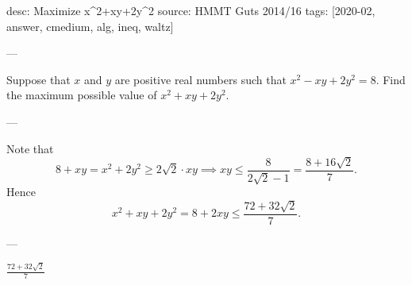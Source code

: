 desc: Maximize x^2+xy+2y^2
source: HMMT Guts 2014/16
tags: [2020-02, answer, cmedium, alg, ineq, waltz]

---

Suppose that $x$ and $y$ are positive real numbers such that $x^2-xy+2y^2=8$. Find the maximum possible value of $x^2+xy+2y^2$.

---

Note that \[8+xy=x^2+2y^2\ge2\sqrt2\cdot xy\implies xy\le\frac8{2\sqrt2-1}=\frac{8+16\sqrt2}7.\]
Hence \[x^2+xy+2y^2=8+2xy\le\frac{72+32\sqrt2}7.\]

---

$\frac{72+32\sqrt2}7$
